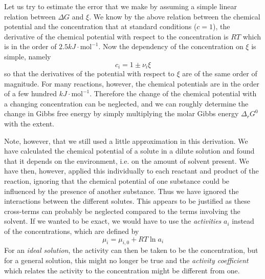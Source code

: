 \documentclass[a4paper, draft]{article}
\theoremstyle{own}
\theoremstyle{remark}
\begin{document}
Let us try to estimate the error that we make by assuming a simple linear relation between $\Delta G$ and $\xi$. We know by the above relation between the chemical potential and the concentration that at standard conditions ($c = 1$), the derivative of the chemical potential with respect to the concentration is $RT$ which is in the order of $2.5 kJ \cdot \text{mol}^{-1}$. Now the dependency of the concentration on $\xi$ is simple, namely
$$
c_i = 1 \pm \nu_i \xi
$$
so that the derivatives of the potential with respect to $\xi$ are of the same order of magnitude. For many reactions, however, the chemical potentials are in the order of a few hundred $kJ \cdot \text{mol}^{-1}$. Therefore the change of the chemical potential with a changing concentration can be neglected, and we can roughly determine the change in Gibbs free energy by simply multiplying the molar Gibbs energy $\Delta_r G^0$ with the extent.


Note, however, that we still used  a little approximation in this derivation. We have calculated the chemical potential of a solute in a dilute solution and found that it depends on the environment, i.e. on the amount of solvent present. We have then, however, applied this individually to each reactant and product of the reaction, ignoring that the chemical potential of one substance could be influenced by the presence of another substance. Thus we have ignored the interactions between the different solutes. This appears to be justified as these cross-terms can probably be neglected compared to the terms involving the solvent. If we wanted to be exact, we would have to use the {\em activities} $a_i$ instead of the concentrations, which are defined by 
$$
\mu_i = \mu_{i,0} + RT \ln a_i
$$
For an {\em ideal solution}, the activity can then be taken to be the concentration, but for a general solution, this might no longer be true and the {\em activity coefficient} which relates the activity to the concentration might be different from one.
\end{document}
